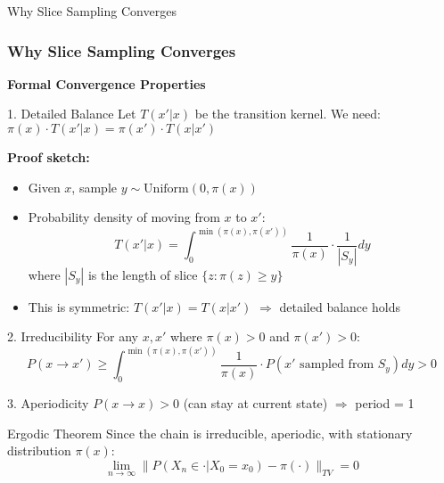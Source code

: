 \documentclass[aspectratio=169]{beamer}
\begin{document}
\begin{frame}{Why Slice Sampling Converges}
	\frametitle{Why Slice Sampling Converges}

	\textbf{Formal Convergence Properties}

	\begin{block}{1. Detailed Balance}
		Let $T(x'|x)$ be the transition kernel. We need: $\pi(x) \cdot T(x'|x) = \pi(x') \cdot T(x|x')$
	\end{block}

	\textbf{Proof sketch:}
	\begin{itemize}
		\item Given $x$, sample $y \sim \text{Uniform}(0, \pi(x))$
		\item Probability density of moving from $x$ to $x'$:
		      $$T(x'|x) = \int_0^{\min(\pi(x),\pi(x'))} \frac{1}{\pi(x)} \cdot \frac{1}{|S_y|} dy$$
		      where $|S_y|$ is the length of slice $\{z : \pi(z) \geq y\}$
		\item This is symmetric: $T(x'|x) = T(x|x')$ $\Rightarrow$ detailed balance holds
	\end{itemize}

	\begin{block}{2. Irreducibility}
		For any $x, x'$ where $\pi(x) > 0$ and $\pi(x') > 0$:
		$$P(x \to x') \geq \int_0^{\min(\pi(x),\pi(x'))} \frac{1}{\pi(x)} \cdot P(x' \text{ sampled from } S_y) dy > 0$$
	\end{block}

	\begin{block}{3. Aperiodicity}
		$P(x \to x) > 0$ (can stay at current state) $\Rightarrow$ period = 1
	\end{block}

	\begin{alertblock}{Ergodic Theorem}
		Since the chain is irreducible, aperiodic, with stationary distribution $\pi(x)$:
		$$\lim_{n\to\infty} \|P(X_n \in \cdot | X_0 = x_0) - \pi(\cdot)\|_{TV} = 0$$
	\end{alertblock}

\end{frame}
\end{document}

